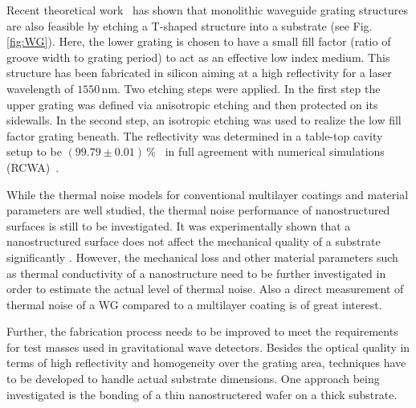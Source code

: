 Recent theoretical work~\cite{Bruckner2009} has shown that monolithic waveguide grating structures are also feasible by etching a T-shaped structure into a substrate (see Fig.\ref{fig:WG}). Here, the lower grating is chosen to have a small fill factor (ratio of groove width to grating period) to act as an effective low index medium.
This structure has been fabricated in silicon aiming at a high reflectivity for a laser wavelength of $1550\,$nm. Two etching steps were applied. In the first step the upper grating was defined via anisotropic etching and then protected on its sidewalls. In the second step, an isotropic etching was used to realize the low fill factor grating beneath. The reflectivity was determined in a table-top cavity setup to be $(99.79\pm 0.01)\,\%$~\cite{Bruckner2010} in full agreement with numerical simulations (RCWA)~\cite{Moharam1981}.

While the thermal noise models for conventional multilayer coatings and material parameters are well studied, the thermal noise performance of nanostructured surfaces is still to be investigated. It was experimentally shown that a nanostructured surface does not affect the mechanical quality of a substrate significantly \cite{Nawrodt2007}. However, the mechanical loss and other material parameters such as thermal conductivity of a nanostructure need to be further investigated in order to estimate the actual level of thermal noise. Also a direct measurement of thermal noise of a WG compared to a multilayer coating is of great interest.

Further, the fabrication process needs to be improved to meet the requirements for test masses used in gravitational wave detectors. Besides the optical quality in terms of high reflectivity and homogeneity over the grating area, techniques have to be developed to handle actual substrate dimensions. One approach being investigated is the bonding of a thin nanostructered wafer on a thick substrate.





